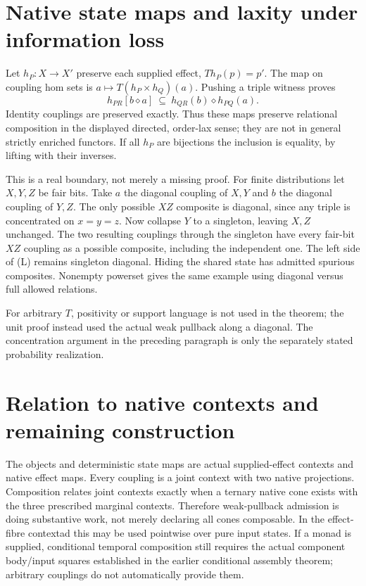 \documentclass[11pt]{article}
\begin{document}
\section{Native state maps and laxity under information loss}
Let $h_P:X\to X'$ preserve each supplied effect, $Th_P(p)=p'$. The map on coupling hom sets is $a\mapsto T(h_P\times h_Q)(a)$. Pushing a triple witness proves
\[
 h_{PR}[b\diamond a]\ \subseteq\ h_{QR}(b)\diamond h_{PQ}(a).
\tag{L}
\]
Identity couplings are preserved exactly. Thus these maps preserve relational composition in the displayed directed, order-lax sense; they are not in general strictly enriched functors. If all $h_P$ are bijections the inclusion is equality, by lifting with their inverses.

This is a real boundary, not merely a missing proof. For finite distributions let $X,Y,Z$ be fair bits. Take $a$ the diagonal coupling of $X,Y$ and $b$ the diagonal coupling of $Y,Z$. The only possible $XZ$ composite is diagonal, since any triple is concentrated on $x=y=z$. Now collapse $Y$ to a singleton, leaving $X,Z$ unchanged. The two resulting couplings through the singleton have every fair-bit $XZ$ coupling as a possible composite, including the independent one. The left side of (L) remains singleton diagonal. Hiding the shared state has admitted spurious composites. Nonempty powerset gives the same example using diagonal versus full allowed relations.

For arbitrary $T$, positivity or support language is not used in the theorem; the unit proof instead used the actual weak pullback along a diagonal. The concentration argument in the preceding paragraph is only the separately stated probability realization.

\section{Relation to native contexts and remaining construction}
The objects and deterministic state maps are actual supplied-effect contexts and native effect maps. Every coupling is a joint context with two native projections. Composition relates joint contexts exactly when a ternary native cone exists with the three prescribed marginal contexts. Therefore weak-pullback admission is doing substantive work, not merely declaring all cones composable. In the effect-fibre contextad this may be used pointwise over pure input states. If a monad is supplied, conditional temporal composition still requires the actual component body/input squares established in the earlier conditional assembly theorem; arbitrary couplings do not automatically provide them.
\end{document}
